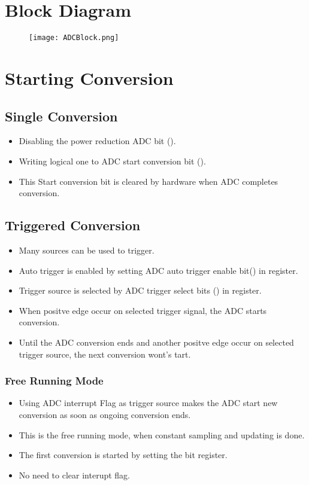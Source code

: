 \documentclass{article}
\begin{document}
\newpage
\section{Block Diagram}
\begin{figure}[H]
    \centering
    \texttt{[image: ADCBlock.png]}
\end{figure}

\section{Starting Conversion}
\subsection{Single Conversion}
\begin{itemize}
    \item Disabling the power reduction ADC bit ().
    \item Writing logical one to ADC start conversion bit ().
    \item This Start conversion bit is cleared by hardware when ADC completes conversion.
\end{itemize}

\subsection{Triggered Conversion}
\begin{itemize}
    \item Many sources can be used to trigger.
    \item Auto trigger is enabled by setting ADC auto trigger enable bit() in  register.
    \item Trigger source is selected by ADC trigger select bits () in  register.
    \item When positve edge occur on selected trigger signal, the ADC starts conversion.
    \item Until the ADC conversion ends and another positve edge occur on selected trigger source, the next conversion wont's tart.
\end{itemize}

\subsubsection{Free Running Mode}
\begin{itemize}
    \item Using ADC interrupt Flag as trigger source makes the ADC start new conversion as soon as ongoing conversion ends.
    \item This is the free running mode, when constant sampling and updating is done.
    \item The first conversion is started by setting the  bit  register.
    \item No need to clear interupt flag.
\end{itemize}
\end{document}
